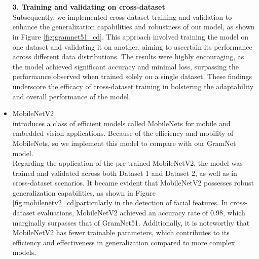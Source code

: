 \documentclass[final]{cvpr}
\begin{document}
\begin{itemize}
            \\
            \\
        \textbf{3. Training and validating on cross-dataset} \\
            Subsequently, we implemented cross-dataset training and validation to enhance the generalization capabilities and robustness of our model, as shown in Figure \ref{fig:gramnet51_cd}. This approach involved training the model on one dataset and validating it on another, aiming to ascertain its performance across different data distributions. The results were highly encouraging, as the model achieved significant accuracy and minimal loss, surpassing the performance observed when trained solely on a single dataset. These findings underscore the efficacy of cross-dataset training in bolstering the adaptability and overall performance of the model.
        \item MobileNetV2 \\
        \cite{howard2017mobilenets} introduces a class of efficient models called MobileNets for mobile and embedded vision applications. Because of the efficiency and mobility of MobileNets, so we implement this model to compare with our GramNet model. \\
        
        Regarding the application of the pre-trained MobileNetV2, the model was trained and validated across both Dataset 1 and Dataset 2, as well as in cross-dataset scenarios. It became evident that MobileNetV2 possesses robust generalization capabilities, as shown in Figure \ref{fig:mobilenetv2_cd}particularly in the detection of facial features. In cross-dataset evaluations, MobileNetV2 achieved an accuracy rate of 0.98, which marginally surpasses that of GramNet51. Additionally, it is noteworthy that MobileNetV2 has fewer trainable parameters, which contributes to its efficiency and effectiveness in generalization compared to more complex models.
\end{itemize}
\end{document}
